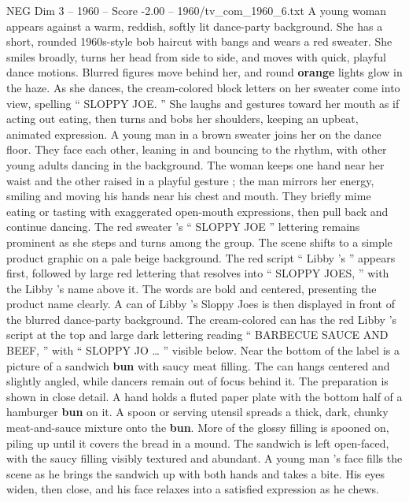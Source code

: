 \begin{textsample}{NEG Dim 3 – 1960 – Score -2.00 – 1960/tv\_com\_1960\_6.txt}  \label{ex:f3_neg_072}
A young woman appears against a warm, reddish, softly lit dance-party background.
She has a short, rounded 1960s-style bob haircut with bangs and wears a red sweater.
She smiles broadly, turns her head from side to side, and moves with quick, playful dance motions.
Blurred figures move behind her, and round \textbf{orange} lights glow in the haze.
As she dances, the cream-colored block letters on her sweater come into view, spelling “ SLOPPY JOE. ” She laughs and gestures toward her mouth as if acting out eating, then turns and bobs her shoulders, keeping an upbeat, animated expression.
A young man in a brown sweater joins her on the dance floor.
They face each other, leaning in and bouncing to the rhythm, with other young adults dancing in the background.
The woman keeps one hand near her waist and the other raised in a playful gesture ; the man mirrors her energy, smiling and moving his hands near his chest and mouth.
They briefly mime eating or tasting with exaggerated open-mouth expressions, then pull back and continue dancing.
The red sweater ’s “ SLOPPY JOE ” lettering remains prominent as she steps and turns among the group.
The scene shifts to a simple product graphic on a pale beige background.
The red script “ Libby ’s ” appears first, followed by large red lettering that resolves into “ SLOPPY JOES, ” with the Libby ’s name above it.
The words are bold and centered, presenting the product name clearly.
A can of Libby ’s Sloppy Joes is then displayed in front of the blurred dance-party background.
The cream-colored can has the red Libby ’s script at the top and large dark lettering reading “ BARBECUE SAUCE AND BEEF, ” with “ SLOPPY JO … ” visible below.
Near the bottom of the label is a picture of a sandwich \textbf{bun} with saucy meat filling.
The can hangs centered and slightly angled, while dancers remain out of focus behind it.
The preparation is shown in close detail.
A hand holds a fluted paper plate with the bottom half of a hamburger \textbf{bun} on it.
A spoon or serving utensil spreads a thick, dark, chunky meat-and-sauce mixture onto the \textbf{bun}.
More of the glossy filling is spooned on, piling up until it covers the bread in a mound.
The sandwich is left open-faced, with the saucy filling visibly textured and abundant.
A young man ’s face fills the scene as he brings the sandwich up with both hands and takes a bite.
His eyes widen, then close, and his face relaxes into a satisfied expression as he chews.

\end{textsample}
